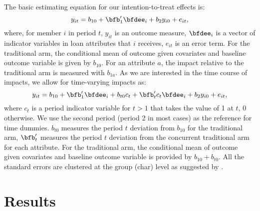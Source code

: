 	The basic estimating equation for our intention-to-treat effects is:
	\begin{equation}
	y_{it}=b_{10}+\bfb'_{1}\bfdee_{i}+b_{2}y_{i0}+e_{it},
	\end{equation}
	where, for member $i$ in period $t$, $y_{it}$ is an outcome measure, $\bfdee_{i}$ is a vector of indicator variables in loan attributes that $i$ receives, $e_{it}$ is an error term. For the \textsf{traditional} arm, the conditional mean of outcome given covariates and baseline outcome variable is given by $b_{10}$. For an attribute $a$, the impact relative to the traditional arm is measured with $b_{1a}$. As we are interested in the time course of impacts, we allow for time-varying impacts as:
	\begin{equation}
	y_{it}=b_{10}+\bfb'_{1}\bfdee_{i}+b_{t0}c_{t}+\bfb'_{t}c_{t}\bfdee_{i}+b_{2}y_{i0}+e_{it},
	\label{EstimatingEqTimeVarying}
	\end{equation}
	where $c_{t}$ is a period indicator variable for $t>1$ that takes the value of 1 at $t$, 0 otherwise. We use the second period (period 2 in most cases) as the reference for time dummies. $b_{t0}$ measures the period $t$ deviation from $b_{10}$ for the \textsf{traditional} arm, $\bfb'_{t}$ measures the period $t$ deviation from the concurrent \textsf{traditional} arm for each attribute. For the \textsf{traditional} arm, the conditional mean of outcome given covariates and baseline outcome variable is provided by $b_{10}+b_{t0}$. All the standard errors are clustered at the group (char) level as suggested by \citet{AbadieAtheyImbensWooldridge2017}.%


\section{Results}
\label{SecResults}






